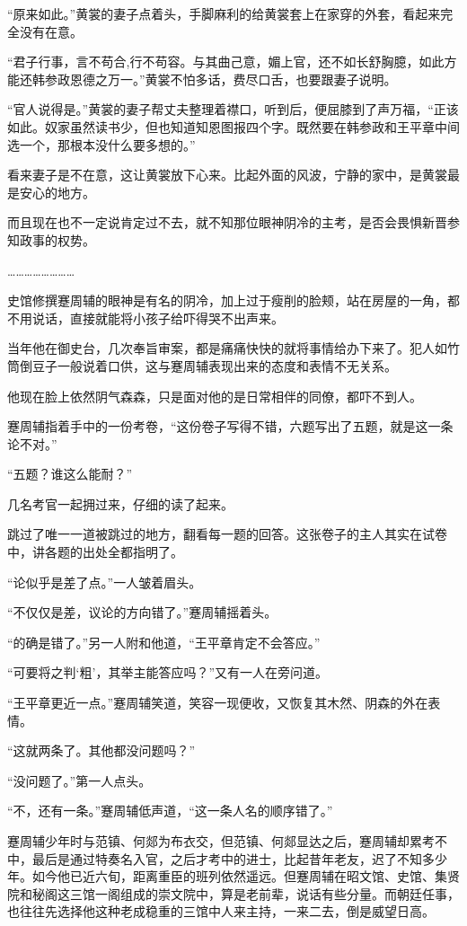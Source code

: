 “原来如此。”黄裳的妻子点着头，手脚麻利的给黄裳套上在家穿的外套，看起来完全没有在意。

“君子行事，言不苟合,行不苟容。与其曲己意，媚上官，还不如长舒胸臆，如此方能还韩参政恩德之万一。”黄裳不怕多话，费尽口舌，也要跟妻子说明。

“官人说得是。”黄裳的妻子帮丈夫整理着襟口，听到后，便屈膝到了声万福，“正该如此。奴家虽然读书少，但也知道知恩图报四个字。既然要在韩参政和王平章中间选一个，那根本没什么要多想的。”

看来妻子是不在意，这让黄裳放下心来。比起外面的风波，宁静的家中，是黄裳最是安心的地方。

而且现在也不一定说肯定过不去，就不知那位眼神阴冷的主考，是否会畏惧新晋参知政事的权势。

……………………

史馆修撰蹇周辅的眼神是有名的阴冷，加上过于瘦削的脸颊，站在房屋的一角，都不用说话，直接就能将小孩子给吓得哭不出声来。

当年他在御史台，几次奉旨审案，都是痛痛快快的就将事情给办下来了。犯人如竹筒倒豆子一般说着口供，这与蹇周辅表现出来的态度和表情不无关系。

他现在脸上依然阴气森森，只是面对他的是日常相伴的同僚，都吓不到人。

蹇周辅指着手中的一份考卷，“这份卷子写得不错，六题写出了五题，就是这一条论不对。”

“五题？谁这么能耐？”

几名考官一起拥过来，仔细的读了起来。

跳过了唯一一道被跳过的地方，翻看每一题的回答。这张卷子的主人其实在试卷中，讲各题的出处全都指明了。

“论似乎是差了点。”一人皱着眉头。

“不仅仅是差，议论的方向错了。”蹇周辅摇着头。

“的确是错了。”另一人附和他道，“王平章肯定不会答应。”

“可要将之判‘粗’，其举主能答应吗？”又有一人在旁问道。

“王平章更近一点。”蹇周辅笑道，笑容一现便收，又恢复其木然、阴森的外在表情。

“这就两条了。其他都没问题吗？”

“没问题了。”第一人点头。

“不，还有一条。”蹇周辅低声道，“这一条人名的顺序错了。”

蹇周辅少年时与范镇、何郯为布衣交，但范镇、何郯显达之后，蹇周辅却累考不中，最后是通过特奏名入官，之后才考中的进士，比起昔年老友，迟了不知多少年。如今他已近六旬，距离重臣的班列依然遥远。但蹇周辅在昭文馆、史馆、集贤院和秘阁这三馆一阁组成的崇文院中，算是老前辈，说话有些分量。而朝廷任事，也往往先选择他这种老成稳重的三馆中人来主持，一来二去，倒是威望日高。

